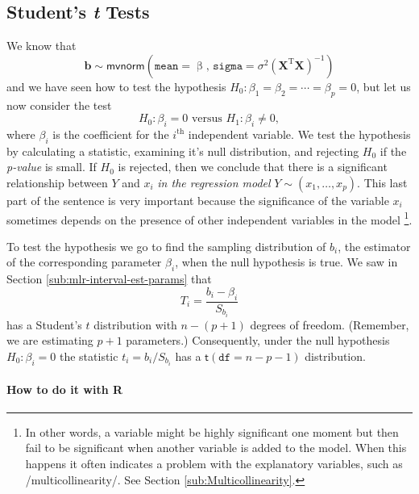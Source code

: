\documentclass[captions=tableheading]{scrbook}
\begin{document}
\subsection{Student's \emph{t} Tests}
\label{sec-12-3-3}

\label{sub:mlr-Student's-t-Tests}

We know that
\begin{equation}
\mathbf{b}\sim\mathsf{mvnorm}\left(\mathtt{mean}=\upbeta,\,\mathtt{sigma}=\sigma^{2}\left(\mathbf{X}^{\mathrm{T}}\mathbf{X}\right)^{-1}\right)
\end{equation}
and we have seen how to test the hypothesis \(H_{0}:\beta_{1}=\beta_{2}=\cdots=\beta_{p}=0\), but let us now consider the test
\begin{equation}
H_{0}:\beta_{i}=0\mbox{ versus }H_{1}:\beta_{i}\neq0,
\end{equation}
where \(\beta_{i}\) is the coefficient for the \(i^{\textrm{th}}\) independent variable. We test the hypothesis by calculating a statistic, examining it's null distribution, and rejecting \(H_{0}\) if the \emph{p-value} is small. If \(H_{0}\) is rejected, then we conclude that there is a significant relationship between \(Y\) and \(x_{i}\) \emph{in the regression model} \(Y\sim(x_{1},\ldots,x_{p})\). This last part of the sentence is very important because the significance of the variable \(x_{i}\) sometimes depends on the presence of other independent variables in the model
\footnote{In other words, a variable might be highly significant one moment but then fail to be significant when another variable is added to the model. When this happens it often indicates a problem with the explanatory variables, such as /multicollinearity/. See Section \ref{sub:Multicollinearity}.}.

To test the hypothesis we go to find the sampling distribution of \( b_{i} \), the estimator of the corresponding parameter \( \beta_{i} \), when the null hypothesis is true. We saw in Section \ref{sub:mlr-interval-est-params} that 
\begin{equation}
T_{i}=\frac{b_{i}-\beta_{i}}{S_{b_{i}}}
\end{equation}
has a Student's \(t\) distribution with \(n-(p+1)\) degrees of freedom. (Remember, we are estimating \(p+1\) parameters.) Consequently, under the null hypothesis \(H_{0}:\beta_{i}=0\) the statistic \(t_{i}=b_{i}/S_{b_{i}}\) has a \(\mathsf{t}(\mathtt{df}=n-p-1)\) distribution.


\paragraph*{How to do it with \textsf{R}}
\end{document}
